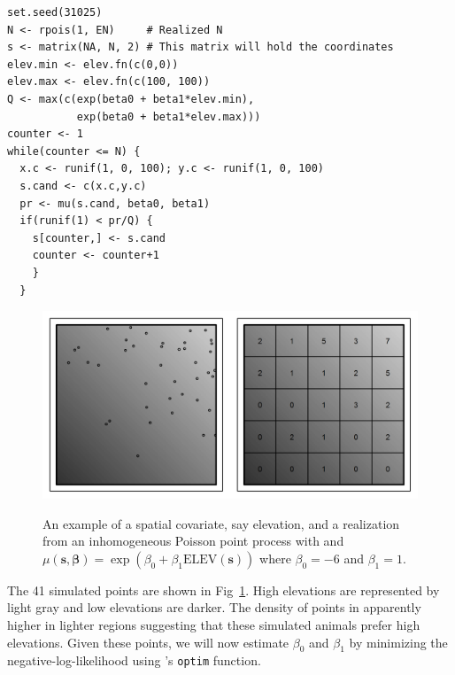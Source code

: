 \begin{samepage}
  \begin{small}
\begin{verbatim}
set.seed(31025)
N <- rpois(1, EN)     # Realized N
s <- matrix(NA, N, 2) # This matrix will hold the coordinates
elev.min <- elev.fn(c(0,0))
elev.max <- elev.fn(c(100, 100))
Q <- max(c(exp(beta0 + beta1*elev.min),
           exp(beta0 + beta1*elev.max)))
counter <- 1
while(counter <= N) {
  x.c <- runif(1, 0, 100); y.c <- runif(1, 0, 100)
  s.cand <- c(x.c,y.c)
  pr <- mu(s.cand, beta0, beta1)
  if(runif(1) < pr/Q) {
    s[counter,] <- s.cand
    counter <- counter+1
    }
  }
\end{verbatim}
  \end{small}
\end{samepage}

\begin{figure}%
\centering
\includegraphics[width=\textwidth]{Ch11/figs/heteroPlots}
\label{state-space.fig.hetero}
\caption{An example of a spatial covariate, say elevation, and a
  realization from an inhomogeneous Poisson point process with
  and $\mu(\mathbf{s}, \bm{\beta}) = \exp(\beta_0 + \beta_1
  \mbox{ELEV}(\mathbf{s}))$ where $\beta_0=-6$ and $\beta_1=1$.}
\end{figure}

The 41 simulated points are shown in
Fig~\ref{state-space.fig.hetero}. High elevations
are represented by light gray and low elevations are darker. The
density of points in apparently higher in lighter regions
suggesting that these simulated animals prefer high
elevations.  %
Given these points, we will now estimate $\beta_0$ and $\beta_1$ by
minimizing the negative-log-likelihood using \R's \verb+optim+
function.


